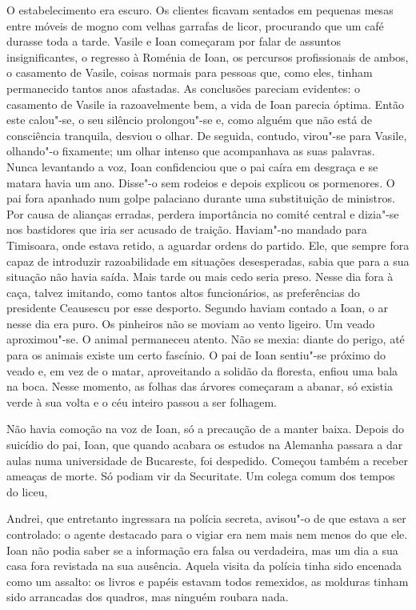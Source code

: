 O estabelecimento era escuro. Os clientes ficavam sentados em pequenas
mesas entre móveis de mogno com velhas garrafas de licor, procurando que
um café durasse toda a tarde. Vasile e Ioan começaram por falar de
assuntos insignificantes, o regresso à Roménia de Ioan, os percursos
profissionais de ambos, o casamento de Vasile, coisas normais para
pessoas que, como eles, tinham permanecido tantos anos afastadas. As
conclusões pareciam evidentes: o casamento de Vasile ia razoavelmente
bem, a vida de Ioan parecia óptima. Então este calou"-se, o seu silêncio
prolongou"-se e, como alguém que não está de consciência tranquila,
desviou o olhar. De seguida, contudo, virou"-se para Vasile, olhando"-o fixamente; um olhar intenso que
acompanhava as suas palavras. Nunca levantando a voz, Ioan
confidenciou que o pai caíra em desgraça e se matara havia um ano.
Disse"-o sem rodeios e depois explicou os pormenores. O pai fora apanhado
num golpe palaciano durante uma substituição de ministros. Por causa de
alianças erradas, perdera importância no comité central e dizia"-se nos
bastidores que iria ser acusado de traição. Haviam"-no mandado para
Timisoara, onde estava retido, a aguardar ordens do partido. Ele, que
sempre fora capaz de introduzir razoabilidade em situações desesperadas, sabia que para a sua situação não havia saída. Mais tarde ou mais
cedo seria preso. Nesse dia fora à caça, talvez imitando, como tantos
altos funcionários, as preferências do presidente Ceausescu por esse
desporto. Segundo haviam contado a Ioan, o ar nesse dia era puro. Os
pinheiros não se moviam ao vento ligeiro. Um veado aproximou"-se. O animal permaneceu atento. Não se mexia: diante do
perigo, até para os animais existe um certo fascínio. O pai de Ioan
sentiu"-se próximo do veado e, em vez de o matar, aproveitando a solidão
da floresta, enfiou uma bala na boca. Nesse momento, as folhas das
árvores começaram a abanar, só existia verde à sua volta e o céu inteiro
passou a ser folhagem.

Não havia comoção na voz de Ioan, só a precaução de a manter baixa.
Depois do suicídio do pai, Ioan, que quando acabara os estudos na
Alemanha passara a dar aulas numa universidade de Bucareste, foi
despedido. Começou também a receber ameaças de morte. Só podiam vir da
Securitate. Um colega comum dos tempos do liceu,

Andrei, que entretanto ingressara na polícia secreta, avisou"-o de que
estava a ser controlado: o agente destacado para o vigiar era nem mais
nem menos do que ele. Ioan não podia saber se a informação era falsa ou
verdadeira, mas um dia a sua casa fora revistada na sua ausência. Aquela
visita da polícia tinha sido encenada como um assalto: os livros e
papéis estavam todos remexidos, as molduras tinham sido arrancadas dos
quadros, mas ninguém roubara nada.

